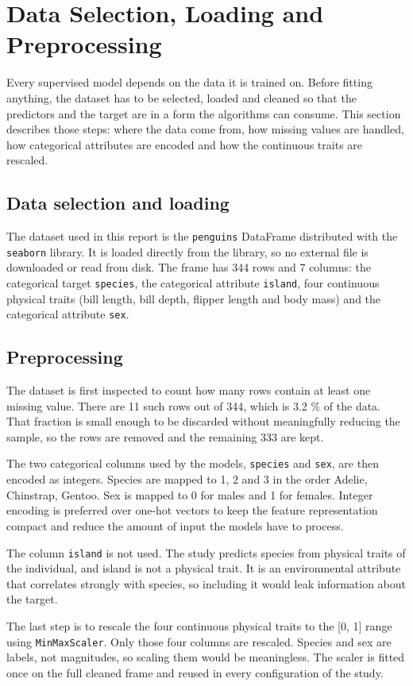 \section{Data Selection, Loading and Preprocessing}
\label{sec:data_loading}

Every supervised model depends on the data it is trained on. Before fitting anything, the dataset has to be selected, loaded and cleaned so that the predictors and the target are in a form the algorithms can consume. This section describes those steps: where the data come from, how missing values are handled, how categorical attributes are encoded and how the continuous traits are rescaled.

\subsection{Data selection and loading}

The dataset used in this report is the \texttt{penguins} DataFrame distributed with the \texttt{seaborn} library. It is loaded directly from the library, so no external file is downloaded or read from disk. The frame has 344 rows and 7 columns: the categorical target \texttt{species}, the categorical attribute \texttt{island}, four continuous physical traits (bill length, bill depth, flipper length and body mass) and the categorical attribute \texttt{sex}.

\subsection{Preprocessing}

The dataset is first inspected to count how many rows contain at least one missing value. There are 11 such rows out of 344, which is 3.2 \% of the data. That fraction is small enough to be discarded without meaningfully reducing the sample, so the rows are removed and the remaining 333 are kept.

The two categorical columns used by the models, \texttt{species} and \texttt{sex}, are then encoded as integers. Species are mapped to 1, 2 and 3 in the order Adelie, Chinstrap, Gentoo. Sex is mapped to 0 for males and 1 for females. Integer encoding is preferred over one-hot vectors to keep the feature representation compact and reduce the amount of input the models have to process.

The column \texttt{island} is not used. The study predicts species from physical traits of the individual, and island is not a physical trait. It is an environmental attribute that correlates strongly with species, so including it would leak information about the target.

The last step is to rescale the four continuous physical traits to the [0, 1] range using \texttt{MinMaxScaler}. Only those four columns are rescaled. Species and sex are labels, not magnitudes, so scaling them would be meaningless. The scaler is fitted once on the full cleaned frame and reused in every configuration of the study.